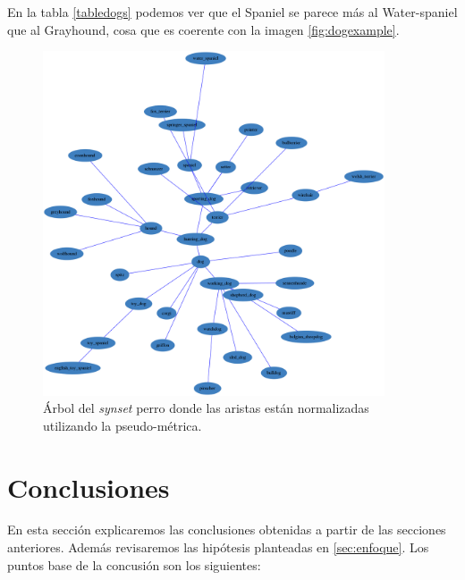 \documentclass[12,twoside]{TFG-GM}
\theoremstyle{definition}
\theoremstyle{remark}
\begin{document}
En la tabla \ref{tabledogs} podemos ver que el Spaniel se parece más al Water-spaniel que al Grayhound, cosa que es coerente con la imagen \ref{fig:dogexample}. 
 

 \begin{figure}[H] 
	\centering
	\includegraphics[width=0.9\textwidth] {Images/forest/dog.png}
	\caption{ Árbol del \textit{synset} perro donde las aristas están normalizadas utilizando la pseudo-métrica.
	\label{fig:grafoperro}}
\end{figure}

\newpage

\section{Conclusiones}

En esta sección explicaremos las conclusiones obtenidas a partir de las secciones anteriores. Además revisaremos las hipótesis planteadas en \ref{sec:enfoque}. Los puntos base de la concusión son los siguientes: 
\end{document}
